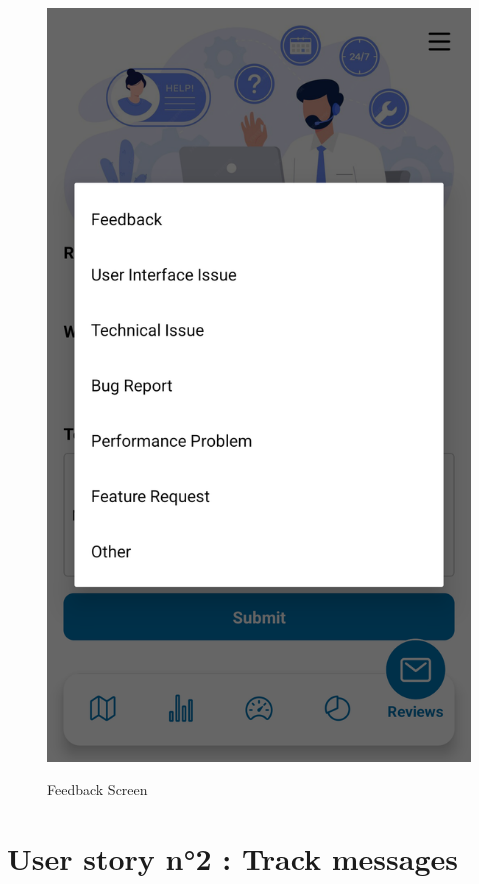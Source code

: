 \begin{figure}[H]
\begin{minipage}{0.32\textwidth}
    \label{fig:login-form-filled}
\end{minipage}\hfill
\begin{minipage}{0.32\textwidth}
    \centering
    \includegraphics[width=\linewidth]{images/sprint4/feedBackModule (5).png}
    \label{fig:login-form}
\end{minipage}\hfill
    \caption{Feedback Screen}
\end{figure}
\newpage
\section{User story n°2 : Track messages}

